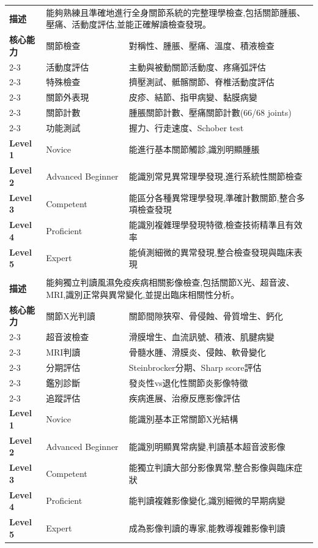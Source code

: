 \documentclass[12pt,a4paper]{article}
\begin{document}
\begin{longtable}{|p{1.2cm}|p{3.8cm}|p{8.5cm}|}
\rowcolor{rheum_purple!10}
\multicolumn{3}{|c|}{\textbf{EPA 2: 關節系統理學檢查}} \\
\hline
\textbf{描述} & \multicolumn{2}{|p{12.5cm}|}{能夠熟練且準確地進行全身關節系統的完整理學檢查,包括關節腫脹、壓痛、活動度評估,並能正確解讀檢查發現。} \\
\hline
\textbf{核心能力} & 關節檢查 & 對稱性、腫脹、壓痛、溫度、積液檢查 \\
\cline{2-3}
& 活動度評估 & 主動與被動關節活動度、疼痛弧評估 \\
\cline{2-3}
& 特殊檢查 & 擠壓測試、骶髂關節、脊椎活動度評估 \\
\cline{2-3}
& 關節外表現 & 皮疹、結節、指甲病變、黏膜病變 \\
\cline{2-3}
& 關節計數 & 腫脹關節計數、壓痛關節計數(66/68 joints) \\
\cline{2-3}
& 功能測試 & 握力、行走速度、Schober test \\
\hline
\textbf{Level 1} & Novice & 能進行基本關節觸診,識別明顯腫脹 \\
\hline
\textbf{Level 2} & Advanced Beginner & 能識別常見異常理學發現,進行系統性關節檢查 \\
\hline
\textbf{Level 3} & Competent & 能區分各種異常理學發現,準確計數關節,整合多項檢查發現 \\
\hline
\textbf{Level 4} & Proficient & 能識別複雜理學發現特徵,檢查技術精準且有效率 \\
\hline
\textbf{Level 5} & Expert & 能偵測細微的異常發現,整合檢查發現與臨床表現 \\
\hline

\rowcolor{rheum_purple!10}
\multicolumn{3}{|c|}{\textbf{EPA 3: 風濕免疫疾病影像判讀}} \\
\hline
\textbf{描述} & \multicolumn{2}{|p{12.5cm}|}{能夠獨立判讀風濕免疫疾病相關影像檢查,包括關節X光、超音波、MRI,識別正常與異常變化,並提出臨床相關性分析。} \\
\hline
\textbf{核心能力} & 關節X光判讀 & 關節間隙狹窄、骨侵蝕、骨質增生、鈣化 \\
\cline{2-3}
& 超音波檢查 & 滑膜增生、血流訊號、積液、肌腱病變 \\
\cline{2-3}
& MRI判讀 & 骨髓水腫、滑膜炎、侵蝕、軟骨變化 \\
\cline{2-3}
& 分期評估 & Steinbrocker分期、Sharp score評估 \\
\cline{2-3}
& 鑑別診斷 & 發炎性vs退化性關節炎影像特徵 \\
\cline{2-3}
& 追蹤評估 & 疾病進展、治療反應影像評估 \\
\hline
\textbf{Level 1} & Novice & 能識別基本正常關節X光結構 \\
\hline
\textbf{Level 2} & Advanced Beginner & 能識別明顯異常病變,判讀基本超音波影像 \\
\hline
\textbf{Level 3} & Competent & 能獨立判讀大部分影像異常,整合影像與臨床症狀 \\
\hline
\textbf{Level 4} & Proficient & 能判讀複雜影像變化,識別細微的早期病變 \\
\hline
\textbf{Level 5} & Expert & 成為影像判讀的專家,能教導複雜影像判讀 \\
\hline


\end{longtable}
\end{document}
